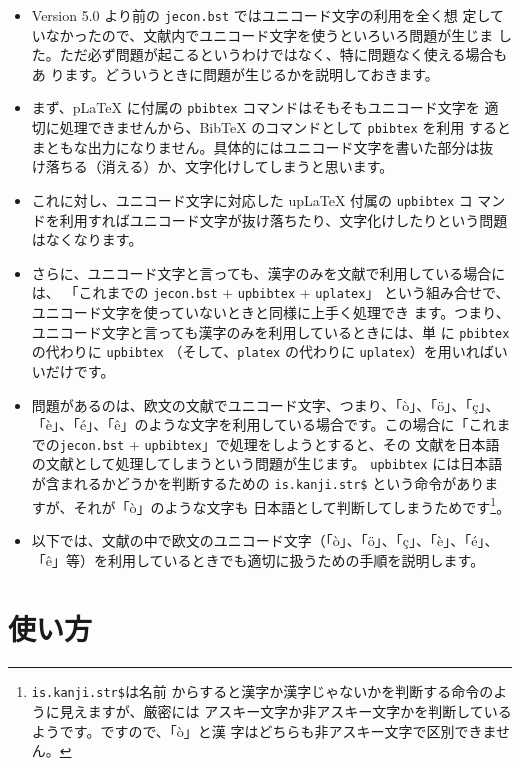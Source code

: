 \documentclass[a4paper,10pt]{bxjsarticle}
\begin{document}
\begin{itemize}
 \item Version 5.0 より前の \texttt{jecon.bst} ではユニコード文字の利用を全く想
       定していなかったので、文献内でユニコード文字を使うといろいろ問題が生じま
       した。ただ必ず問題が起こるというわけではなく、特に問題なく使える場合もあ
       ります。どういうときに問題が生じるかを説明しておきます。
 \item まず、pLaTeX に付属の \texttt{pbibtex} コマンドはそもそもユニコード文字を
       適切に処理できませんから、BibTeX のコマンドとして \texttt{pbibtex} を利用
       するとまともな出力になりません。具体的にはユニコード文字を書いた部分は抜
       け落ちる（消える）か、文字化けしてしまうと思います。
 \item これに対し、ユニコード文字に対応した upLaTeX 付属の \texttt{upbibtex} コ
       マンドを利用すればユニコード文字が抜け落ちたり、文字化けしたりという問題
       はなくなります。
 \item さらに、ユニコード文字と言っても、漢字のみを文献で利用している場合には、
       「これまでの \texttt{jecon.bst} + \texttt{upbibtex} + \texttt{uplatex}」
       という組み合せで、ユニコード文字を使っていないときと同様に上手く処理でき
       ます。つまり、ユニコード文字と言っても漢字のみを利用しているときには、単
       に \texttt{pbibtex}の代わりに \texttt{upbibtex} （そして、\texttt{platex}
       の代わりに \texttt{uplatex}）を用いればいいだけです。
 \item 問題があるのは、欧文の文献でユニコード文字、つまり、「ò」、「ö」、「ç」、
       「è」、「é」、「ê」のような文字を利用している場合です。この場合に「これま
       での\texttt{jecon.bst} + \texttt{upbibtex}」で処理をしようとすると、その
       文献を日本語の文献として処理してしまうという問題が生じます。
       \texttt{upbibtex} には日本語が含まれるかどうかを判断するための
       \texttt{is.kanji.str\$} という命令がありますが、それが「ò」のような文字も
       日本語として判断してしまうためです\footnote{\texttt{is.kanji.str\$}は名前
       からすると漢字か漢字じゃないかを判断する命令のように見えますが、厳密には
       アスキー文字か非アスキー文字かを判断しているようです。ですので、「ò」と漢
       字はどちらも非アスキー文字で区別できません。}。
 \item 以下では、文献の中で欧文のユニコード文字（「ò」、「ö」、「ç」、「è」、「é」、
       「ê」等）を利用しているときでも適切に扱うための手順を説明します。
\end{itemize}

\section{使い方}
\end{document}
